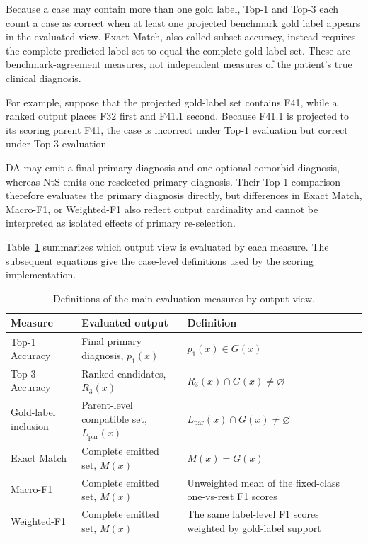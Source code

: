 \documentclass[12pt,a4paper,oneside]{report}
\begin{document}
Because a case may contain more than one gold label, Top-1 and Top-3 each count a case as correct when at least one projected benchmark gold label appears in the evaluated view. Exact Match, also called subset accuracy, instead requires the complete predicted label set to equal the complete gold-label set. These are benchmark-agreement measures, not independent measures of the patient's true clinical diagnosis.

For example, suppose that the projected gold-label set contains F41, while a ranked output places F32 first and F41.1 second. Because F41.1 is projected to its scoring parent F41, the case is incorrect under Top-1 evaluation but correct under Top-3 evaluation.

DA may emit a final primary diagnosis and one optional comorbid diagnosis, whereas NtS emits one reselected primary diagnosis. Their Top-1 comparison therefore evaluates the primary diagnosis directly, but differences in Exact Match, Macro-F1, or Weighted-F1 also reflect output cardinality and cannot be interpreted as isolated effects of primary re-selection.

Table~\ref{tab:metric-contract} summarizes which output view is evaluated by each measure. The subsequent equations give the case-level definitions used by the scoring implementation.

\begin{table}[H]
\centering
\caption{Definitions of the main evaluation measures by output view.}
\label{tab:metric-contract}
\small
\begin{tabularx}{\textwidth}{|>{\raggedright\arraybackslash}p{3.2cm}|>{\raggedright\arraybackslash}p{3.8cm}|>{\raggedright\arraybackslash}X|}
\hline
Measure & Evaluated output & Definition\\
\hline
Top-1 Accuracy & Final primary diagnosis, $p_1(x)$ & $p_1(x)\in G(x)$\\
\hline
Top-3 Accuracy & Ranked candidates, $R_3(x)$ & $R_3(x)\cap G(x)\neq\varnothing$\\
\hline
Gold-label inclusion & Parent-level compatible set, $L_{\mathrm{par}}(x)$ & $L_{\mathrm{par}}(x)\cap G(x)\neq\varnothing$\\
\hline
Exact Match & Complete emitted set, $M(x)$ & $M(x)=G(x)$\\
\hline
Macro-F1 & Complete emitted set, $M(x)$ & Unweighted mean of the fixed-class one-vs-rest F1 scores\\
\hline
Weighted-F1 & Complete emitted set, $M(x)$ & The same label-level F1 scores weighted by gold-label support\\
\hline
\end{tabularx}
\end{table}
\end{document}

